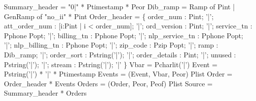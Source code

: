 \begin{code}\scriptsize
{} Summary\_header = "0|" * Ptimestamp * Peor
\mbox{}
 Dib\_ramp = 
  Ramp of Pint 
| GenRamp of "no\_ii" * Pint
\mbox{}
 Order\_header = \{ 
     order\_num : Pint;  
'|'; att\_order\_num : [i:Pint | i < order\_num];  
'|'; ord\_version : Pint;  
'|'; service\_tn : Pphone Popt;
'|'; billing\_tn : Pphone Popt;  
'|'; nlp\_service\_tn : Pphone Popt;  
'|'; nlp\_billing\_tn : Pphone Popt;  
'|'; zip\_code : Pzip Popt;  
'|'; ramp : Dib\_ramp;  
'|'; order\_sort : Pstring('|');  
'|'; order\_details : Pint;
'|'; unused : Pstring('|');  
'|'; stream : Pstring('|'); 
'|'
\} 
\mbox{}
 Vbar = Pcharlit('|')
\mbox{}
 Event  = Pstring('|') * '|' * Ptimestamp
 Events = (Event, Vbar, Peor) Plist
\mbox{}
 Order  = Order\_header * Events
 Orders = (Order, Peor, Peof) Plist
\mbox{}
 Source = Summary\_header * Orders
\end{code}

